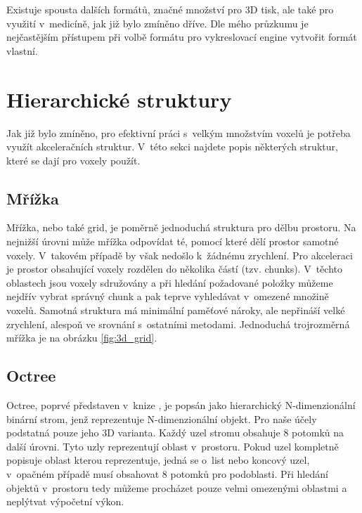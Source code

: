 Existuje spousta dalších formátů, značné množství pro 3D tisk, ale také pro využití v~medicíně, jak již bylo zmíněno dříve. Dle mého průzkumu je nejčastějším přístupem při volbě formátu pro vykreslovací engine vytvořit formát vlastní.


\section{Hierarchické struktury}
Jak již bylo zmíněno, pro efektivní práci s~velkým množstvím voxelů je potřeba využít akceleračních struktur. V~této sekci najdete popis některých struktur, které se dají pro voxely použít.

\subsection{Mřížka}
Mřížka, nebo také grid, je poměrně jednoduchá struktura pro dělbu prostoru. Na nejnižší úrovni může mřížka odpovídat té, pomocí které dělí prostor samotné voxely. V~takovém případě by však nedošlo k~žádnému zrychlení. Pro akceleraci je prostor obsahující voxely rozdělen do několika částí (tzv. chunks). V~těchto oblastech jsou voxely sdružovány a při hledání požadované položky můžeme nejdřív vybrat správný chunk a pak teprve vyhledávat v~omezené množině voxelů. Samotná struktura má minimální paměťové nároky, ale nepřináší velké zrychlení, alespoň ve srovnání s~ostatními metodami. Jednoduchá trojrozměrná mřížka je na obrázku \ref{fig:3d_grid}.

\subsection{Octree} \label{octree}
Octree, poprvé představen v~knize \cite{rensselaer1980octree}, je popsán jako hierarchický N-dimenzionální binární strom, jenž reprezentuje N-dimenzionální objekt. Pro naše účely podstatná pouze jeho 3D varianta. Každý uzel stromu obsahuje 8 potomků na další úrovni. Tyto uzly reprezentují oblast v~prostoru. Pokud uzel kompletně popisuje oblast kterou reprezentuje, jedná se o~list nebo koncový uzel, v~opačném případě musí obsahovat 8 potomků pro podoblasti. Při hledání objektů v~prostoru tedy můžeme procházet pouze velmi omezenými oblastmi a neplýtvat výpočetní výkon.

